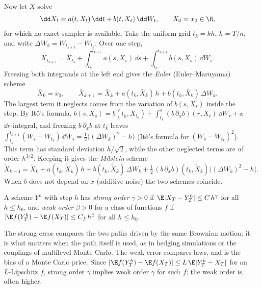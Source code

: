Now let $X$ solve
\begin{equation}\label{eq:ps-sde}
  \dd X_t=a(t,X_t)\,\dd t+b(t,X_t)\,\dd W_t,\qquad X_0=x_0\in\R,
\end{equation}
for which no exact sampler is available. Take the uniform grid $t_k=kh$, $h=T/n$, and
write $\Delta W_k=W_{t_{k+1}}-W_{t_k}$. Over one step,
\[
  X_{t_{k+1}}=X_{t_k}+\int_{t_k}^{t_{k+1}}a(s,X_s)\,\dd s+\int_{t_k}^{t_{k+1}}b(s,X_s)\,\dd W_s .
\]
Freezing both integrands at the left end gives the \emph{Euler} (Euler--Maruyama) scheme
\begin{equation}\label{eq:ps-euler}
  \bar X_0=x_0,\qquad \bar X_{k+1}=\bar X_k+a(t_k,\bar X_k)\,h+b(t_k,\bar X_k)\,\Delta W_k .
\end{equation}
The largest term it neglects comes from the variation of $b(s,X_s)$ inside the step. By
It\^o's formula, $b(s,X_s)=b(t_k,X_{t_k})+\int_{t_k}^s(b\,\partial_xb)(r,X_r)\,\dd W_r+{}$a
$\dd r$-integral, and freezing $b\,\partial_xb$ at $t_k$ leaves
$\int_{t_k}^{t_{k+1}}(W_s-W_{t_k})\,\dd W_s=\frac12\big((\Delta W_k)^2-h\big)$ (It\^o's
formula for $(W_s-W_{t_k})^2$). This term has standard deviation $h/\sqrt2$, while the
other neglected terms are of order $h^{3/2}$. Keeping it gives the \emph{Milstein} scheme
\begin{equation}\label{eq:ps-milstein}
  \tilde X_{k+1}=\tilde X_k+a(t_k,\tilde X_k)\,h+b(t_k,\tilde X_k)\,\Delta W_k
  +\tfrac12\,(b\,\partial_xb)(t_k,\tilde X_k)\big((\Delta W_k)^2-h\big).
\end{equation}
When $b$ does not depend on $x$ (additive noise) the two schemes coincide.

\begin{definition}\label{def:ps-orders}
A scheme $Y^h$ with step $h$ has \emph{strong order} $\gamma>0$ if
$\E|X_T-Y^h_T|\le C\,h^\gamma$ for all $h\le h_0$, and \emph{weak order} $\beta>0$ for a
class of functions $f$ if $|\E f(Y^h_T)-\E f(X_T)|\le C_f\,h^\beta$ for all $h\le h_0$.
\end{definition}

The strong error compares the two paths driven by the same Brownian motion; it is what
matters when the path itself is used, as in hedging simulations or the couplings of
multilevel Monte Carlo. The weak error compares laws, and is the bias of a Monte Carlo
price. Since $|\E f(Y^h_T)-\E f(X_T)|\le L\,\E|Y^h_T-X_T|$ for an $L$-Lipschitz $f$, strong
order $\gamma$ implies weak order $\gamma$ for such $f$; the weak order is often higher.

